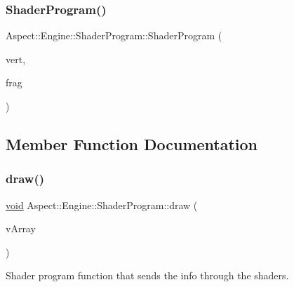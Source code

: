 \subsubsection{\texorpdfstring{Shader\+Program()}{ShaderProgram()}}
{\footnotesize\ttfamily Aspect\+::\+Engine\+::\+Shader\+Program\+::\+Shader\+Program (\begin{DoxyParamCaption}\item[{\mbox{\hyperlink{_s_d_l__opengl__glext_8h_ae84541b4f3d8e1ea24ec0f466a8c568b}{std\+::string}}}]{vert,  }\item[{\mbox{\hyperlink{_s_d_l__opengl__glext_8h_ae84541b4f3d8e1ea24ec0f466a8c568b}{std\+::string}}}]{frag }\end{DoxyParamCaption})}



\subsection{Member Function Documentation}
\mbox{\label{class_aspect_1_1_engine_1_1_shader_program_a4ecfbdda05fbfb1d5a36f6d584dd0ef2}} 
\subsubsection{\texorpdfstring{draw()}{draw()}}
{\footnotesize\ttfamily \mbox{\hyperlink{_s_d_l__opengles2__gl2ext_8h_ae5d8fa23ad07c48bb609509eae494c95}{void}} Aspect\+::\+Engine\+::\+Shader\+Program\+::draw (\begin{DoxyParamCaption}\item[{std\+::shared\+\_\+ptr$<$ \mbox{\hyperlink{class_aspect_1_1_engine_1_1_vertex_array}{Vertex\+Array}} $>$}]{v\+Array }\end{DoxyParamCaption})}



Shader program function that sends the info through the shaders. 

\mbox{\label{class_aspect_1_1_engine_1_1_shader_program_a78a54e4a39c3e605f7a5832e6ce7f692}} 
